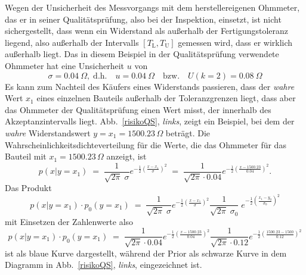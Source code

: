 Wegen der Unsicherheit des Messvorgangs mit dem herstellereigenen Ohmmeter, das er
in seiner Qualitätsprüfung, also bei der Inspektion, einsetzt, ist nicht sichergestellt,
dass wenn ein Widerstand als außerhalb der
Fertigungstoleranz liegend, also außerhalb der Intervalls $[T_\mathrm{L}, T_\mathrm{U}]$
gemessen wird, dass er wirklich außerhalb liegt.
Das in diesem Beispiel in der Qualitätsprüfung verwendete Ohmmeter hat eine
Unsicherheit $u$ von
 \[
\sigma = 0.04~\Omega, \; \mathrm{d.h.}\quad u= 0.04~\Omega \quad \mathrm{bzw.} \quad U(k=2) = 0.08~\Omega
\]
Es kann zum Nachteil des Käufers eines Widerstands passieren,
dass der \textsl{wahre} Wert $x_1$ eines einzelnen Bauteils außerhalb der
Toleranzgrenzen liegt, dass aber das Ohmmeter der Qualitätsprüfung einen Wert misst, der
innerhalb des Akzeptanzintervalls liegt. Abb.~\ref{risikoQS}, \textsl{links}, zeigt ein Beispiel, bei dem der \textsl{wahre} Widerstandswert $y = x_1 = 1500.23 \, \Omega$ beträgt.
Die Wahrscheinlichkeitsdichteverteilung für die Werte, die das Ohmmeter für das
Bauteil mit $x_1 = 1500.23 \, \Omega$ anzeigt, ist
\begin{equation}
p(x | y=x_1) \; = \;  \frac{1}{\sqrt{2 \pi} \; \sigma}
	e^{-\frac{1}{2}\left(\frac{x - x_1}{\sigma}\right)^2} \; = \;
 \frac{1}{\sqrt{2 \pi} \cdot 0.04}
	e^{-\frac{1}{2}\left(\frac{x - 1500.23}{0.04}\right)^2}.
\end{equation}
Das Produkt
\begin{equation}
p(x | y=x_1) \cdot p_0(y=x_1) \; = \; \frac{1}{\sqrt{2 \pi} \; \sigma}
	e^{-\frac{1}{2}\left(\frac{x - x_1}{\sigma}\right)^2}
  \frac{1}{\sqrt{2 \pi} \; \sigma_0} \;
  	e^{-\frac{1}{2}\left(\frac{x_1 - y_0}{\sigma_0}\right)^2}
\end{equation}
mit Einsetzen der Zahlenwerte also
\begin{equation*}
p(x | y=x_1) \cdot p_0(y=x_1)  \; = \;
 \frac{1}{\sqrt{2 \pi} \cdot 0.04}
	e^{-\frac{1}{2}\left(\frac{x - 1500.23}{0.04}\right)^2}
  \frac{1}{\sqrt{2 \pi} \cdot 0.12}
   e^{-\frac{1}{2}\left(\frac{1500.23 - 1500}{0.12}\right)^2}
\end{equation*}
ist als blaue Kurve dargestellt, während der Prior als schwarze Kurve in
dem Diagramm in Abb.~\ref{risikoQS}, \textsl{links}, eingezeichnet ist.
